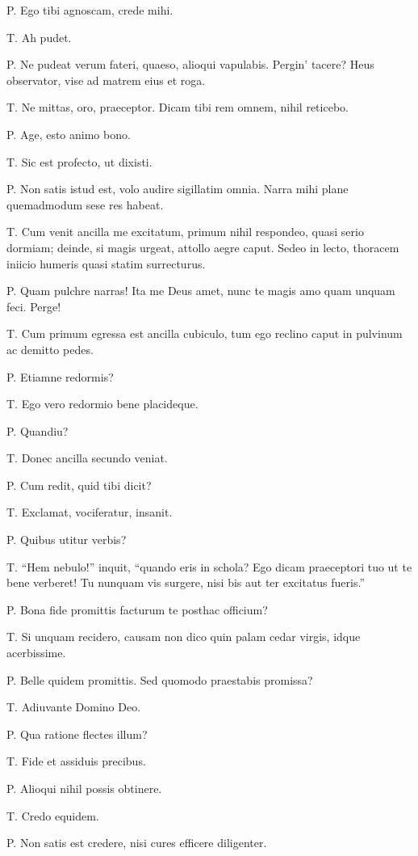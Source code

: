 \documentclass{article}
\begin{document}
P. Ego tibi agnoscam, crede mihi.

T. Ah pudet.

P. Ne pudeat verum fateri, quaeso, alioqui vapulabis. Pergin' tacere? Heus observator, vise ad matrem eius et roga.

T. Ne mittas, oro, praeceptor. Dicam tibi rem omnem, nihil reticebo.

P. Age, esto animo bono.

T. Sic est profecto, ut dixisti.

P. Non satis istud est, volo audire sigillatim omnia. Narra mihi plane quemadmodum sese res habeat.

T. Cum venit ancilla me excitatum, primum nihil respondeo, quasi serio dormiam; deinde, si magis urgeat, attollo aegre caput. Sedeo in lecto, thoracem iniicio humeris quasi statim surrecturus.

P. Quam pulchre narras! Ita me Deus amet, nunc te magis amo quam unquam feci. Perge!

T. Cum primum egressa est ancilla cubiculo, tum ego reclino caput in pulvinum ac demitto pedes.

P. Etiamne redormis?

T. Ego vero redormio bene placideque.

P. Quandiu?

T. Donec ancilla secundo veniat.

P. Cum redit, quid tibi dicit?

T. Exclamat, vociferatur, insanit.

P. Quibus utitur verbis?

T. ``Hem nebulo!'' inquit, ``quando eris in schola? Ego dicam praeceptori tuo ut te bene verberet! Tu nunquam vis surgere, nisi bis aut ter excitatus fueris.''

P. Bona fide promittis facturum te posthac officium?

T. Si unquam recidero, causam non dico quin palam cedar virgis, idque acerbissime.

P. Belle quidem promittis. Sed quomodo praestabis promissa?

T. Adiuvante Domino Deo.

P. Qua ratione flectes illum?

T. Fide et assiduis precibus.

P. Alioqui nihil possis obtinere.

T. Credo equidem.

P. Non satis est credere, nisi cures efficere diligenter.
\end{document}
